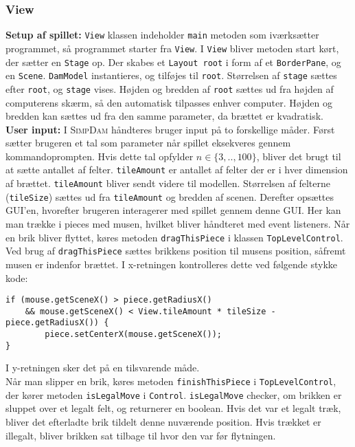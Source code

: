 \subsubsection{View}
\textbf{Setup af spillet:} 
\texttt{View} klassen indeholder \texttt{main} metoden som iværksætter programmet, så programmet starter fra \texttt{View}. I \texttt{View} bliver metoden start kørt, der sætter en \texttt{Stage} op. Der skabes et \texttt{Layout root} i form af et \texttt{BorderPane}, og en \texttt{Scene}. \texttt{DamModel} instantieres, og tilføjes til \texttt{root}. Størrelsen af \texttt{stage} sættes efter \texttt{root}, og \texttt{stage} vises. Højden og bredden af \texttt{root} sættes ud fra højden af computerens skærm, så den automatisk tilpasses enhver computer. Højden og bredden kan sættes ud fra den samme parameter, da brættet er kvadratisk.\\ 

\textbf{User input:} I \textsc{SimpDam}  håndteres bruger input på to forskellige måder. Først sætter brugeren et tal som parameter når spillet eksekveres gennem kommandoprompten. Hvis dette tal opfylder $n \in \{3, .., 100\}$, bliver det brugt til at sætte antallet af felter. \texttt{tileAmount} er antallet af felter der er i hver dimension af brættet. \texttt{tileAmount} bliver sendt videre til modellen. Størrelsen af felterne (\texttt{tileSize}) sættes ud fra \texttt{tileAmount} og bredden af scenen. 
Derefter opsættes GUI'en, hvorefter brugeren interagerer med spillet gennem denne GUI. Her kan man trække i pieces med musen, hvilket bliver håndteret med event listeners. Når en brik bliver flyttet, køres metoden \texttt{dragThisPiece} i klassen  \texttt{TopLevelControl}. Ved brug af \texttt{dragThisPiece} sættes brikkens position til musens position, såfremt musen er indenfor brættet. I x-retningen kontrolleres dette ved følgende stykke kode:

\begin{lstlisting}
if (mouse.getSceneX() > piece.getRadiusX()
	&& mouse.getSceneX() < View.tileAmount * tileSize - piece.getRadiusX()) {
	    piece.setCenterX(mouse.getSceneX());
}
\end{lstlisting}

I y-retningen sker det på en tilsvarende måde. \\
Når man slipper en brik, køres metoden \texttt{finishThisPiece} i \texttt{TopLevelControl}, der kører metoden \texttt{isLegalMove} i \texttt{Control}. \texttt{isLegalMove} checker, om brikken er sluppet over et legalt felt, og returnerer en boolean. Hvis det var et legalt træk, bliver det efterladte brik tildelt denne nuværende position. Hvis trækket er illegalt, bliver brikken sat tilbage til hvor den var før flytningen.
